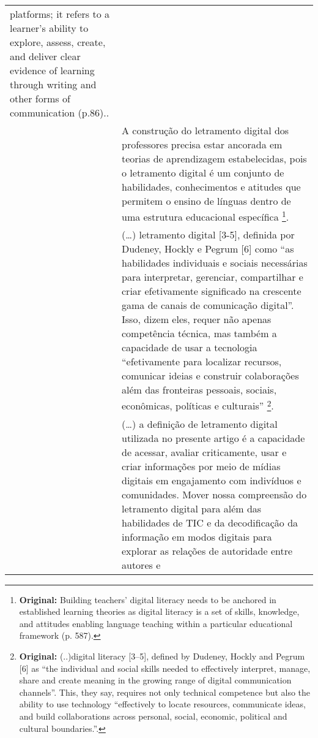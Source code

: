 \begin{small}
\begin{longtable}{p{} p{}}
{      platforms; it refers to a learner's ability to explore, assess,
      create, and deliver clear evidence of learning through writing and
      other forms of communication (p.86).}. \\
    \textcite{krajka2021} & A construção do letramento digital dos professores
    precisa estar ancorada em teorias de aprendizagem estabelecidas, pois o
    letramento digital é um conjunto de habilidades, conhecimentos e
    atitudes que permitem o ensino de línguas dentro de uma estrutura
    educacional específica \cite[p.~587, tradução
    nossa]{krajka2021}\footnote{\textbf{Original:} Building teachers' digital literacy
      needs to be anchored in established learning theories as digital
      literacy is a set of skills, knowledge, and attitudes enabling
      language teaching within a particular educational framework (p. 587).}. \\
    \textcite{dhillon2021investigation} & (\ldots) letramento digital {[}3-5{]}, definida
    por Dudeney, Hockly e Pegrum {[}6{]} como ``as habilidades individuais e
    sociais necessárias para interpretar, gerenciar, compartilhar e criar
    efetivamente significado na crescente gama de canais de comunicação
    digital''. Isso, dizem eles, requer não apenas competência
    técnica, mas também a capacidade de usar a tecnologia ``efetivamente
    para localizar recursos, comunicar ideias e construir colaborações além
    das fronteiras pessoais, sociais, econômicas, políticas e culturais''
    \cite[p.~2, tradução nossa]{dhillon2021investigation}\footnote{\textbf{Original:}
      (..)digital literacy {[}3--5{]}, defined by Dudeney, Hockly and Pegrum
      {[}6{]} as ``the individual and social skills needed to effectively
      interpret, manage, share and create meaning in the growing range of
      digital communication channels''. This, they say, requires not
      only technical competence but also the ability to use technology
      ``effectively to locate resources, communicate ideas, and build
      collaborations across personal, social, economic, political and
      cultural boundaries.''.}. \\
    \textcite{roche2017assessing} & (\ldots) a definição de letramento digital utilizada no
    presente artigo é a capacidade de acessar, avaliar criticamente, usar e
    criar informações por meio de mídias digitais em engajamento com
    indivíduos e comunidades. Mover nossa compreensão do letramento digital
    para além das habilidades de TIC e da decodificação da informação em
    modos digitais para explorar as relações de autoridade entre autores e

\end{longtable}
\end{small}
